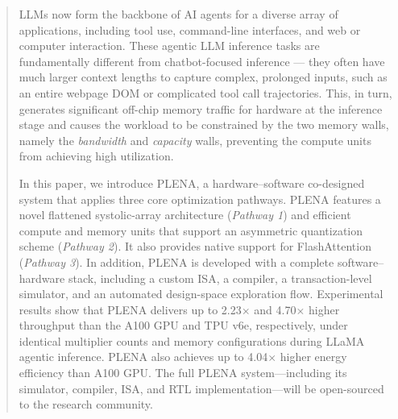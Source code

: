 \documentclass[conference]{IEEEtran}
\begin{document}
\maketitle
\thispagestyle{plain}
\pagestyle{plain}




\begin{abstract}

LLMs now form the backbone of AI agents for a diverse array of applications, including tool use, command-line interfaces, and web or computer interaction. These agentic LLM inference tasks are fundamentally different from chatbot-focused inference
--- they often have much larger context lengths to capture complex, prolonged inputs, such as an entire webpage DOM or complicated tool call trajectories. 
This, in turn, generates significant off-chip memory traffic for hardware at the inference stage and causes the workload to be constrained by the two memory walls, namely the \textit{bandwidth} and \textit{capacity} walls, preventing the compute units from achieving high utilization.

In this paper, we introduce PLENA, a hardware–software co-designed system that applies three core optimization pathways. PLENA features a novel flattened systolic-array architecture (\textit{Pathway 1}) and efficient compute and memory units that support an asymmetric quantization scheme (\textit{Pathway 2}). It also provides native support for FlashAttention (\textit{Pathway 3}). In addition, PLENA is developed with a complete software–hardware stack, including a custom ISA, a compiler, a transaction-level simulator, and an automated design-space exploration flow. Experimental results show that PLENA delivers up to 2.23$\times$ and 4.70$\times$ higher throughput than the A100 GPU and TPU v6e, respectively, under identical multiplier counts and memory configurations during LLaMA agentic inference. PLENA also achieves up to 4.04$\times$ higher energy efficiency than A100 GPU. The full PLENA system—including its simulator, compiler, ISA, and RTL implementation—will be open-sourced to the research community.

\end{abstract}













\end{document}
